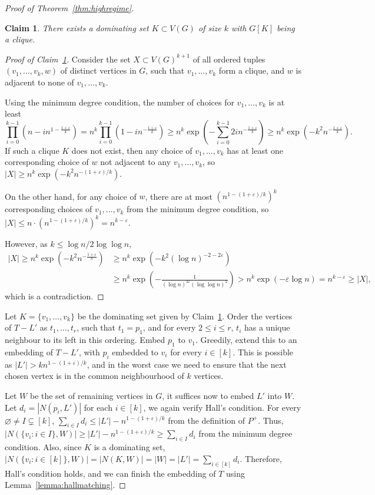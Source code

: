 \documentclass{article}
\theoremstyle{plain}
\newtheorem{claim}[theorem]{Claim}
\theoremstyle{definition}
\numberwithin{equation}{section}
\def\eps{\varepsilon}
\begin{document}
\begin{proof}[Proof of Theorem~\ref{thm:highregime}]
\begin{claim}\label{claim1}
There exists a dominating set $K\subset V(G)$ of size $k$ with $G[K]$ being a clique.
\end{claim}
\begin{proof}[Proof of Claim~\ref{claim1}]
Consider the set $X\subset V(G)^{k+1}$ of all ordered tuples $(v_1,\ldots,v_k,w)$ of distinct vertices in $G$, such that $v_1,\ldots,v_k$ form a clique, and $w$ is adjacent to none of $v_1,\ldots,v_k$. 

Using the minimum degree condition, the number of choices for $v_1,\ldots,v_k$ is at least 
\[\prod_{i=0}^{k-1}\left(n-in^{1-\frac{1+\eps}k}\right)=n^k\prod_{i=0}^{k-1}\left(1-in^{-\frac{1+\eps}k}\right)\geq n^k\exp\left(-\sum_{i=0}^{k-1}2in^{-\frac{1+\eps}k}\right)\geq n^k\exp\left(-k^2n^{-\frac{1+\eps}k}\right).\]
If such a clique $K$ does not exist, then any choice of $v_1,\ldots,v_k$ has at least one corresponding choice of $w$ not adjacent to any $v_1,\ldots,v_k$, so $|X|\geq n^k\exp(-k^2n^{-(1+\eps)/k})$.

On the other hand, for any choice of $w$, there are at most $(n^{1-(1+\eps)/k})^k$ corresponding choices of $v_1,\ldots,v_k$ from the minimum degree condition, so $|X|\leq n\cdot(n^{1-(1+\eps)/k})^k=n^{k-\eps}$. 

However, as $k\leq\log n/2\log\log n$, 
\begin{align*}
|X|\geq n^k\exp\left(-k^2n^{-\frac{1+\eps}k}\right)&\geq n^k\exp\left(-k^2(\log n)^{-2-2\eps}\right)\\
&\geq n^k\exp\left(-\frac1{(\log n)^{2\eps}(\log\log n)^2}\right)>n^k\exp\left(-\eps\log n\right)=n^{k-\eps}\geq|X|,
\end{align*}
which is a contradiction. 
\renewcommand{\qedsymbol}{$\boxdot$}
\end{proof}
\renewcommand{\qedsymbol}{$\square$}
Let $K=\{v_1,\ldots,v_k\}$ be the dominating set given by Claim~\ref{claim1}. Order the vertices of $T-L'$ as $t_1,\ldots,t_r$, such that $t_1=p_1$, and for every $2\leq i\leq r$, $t_i$ has a unique neighbour to its left in this ordering. Embed $p_1$ to $v_1$. Greedily, extend this to an embedding of $T-L'$, with $p_i$ embedded to $v_i$ for every $i\in[k]$. This is possible as $|L'|>kn^{1-(1+\eps)/k}$, and in the worst case we need to ensure that the next chosen vertex is in the common neighbourhood of $k$ vertices. 

Let $W$ be the set of remaining vertices in $G$, it suffices now to embed $L'$ into $W$. Let $d_i=|N(p_i,L')|$ for each $i\in[k]$, we again verify Hall's condition. For every $\varnothing\not=I\subsetneq[k]$, $\sum_{i\in I}d_i\leq |L'|-n^{1-(1+\eps)/k}$ from the definition of $P^+$. Thus, $|N(\{v_i:i\in I\},W)|\geq|L'|-n^{1-(1+\eps)/k}\geq\sum_{i\in I}d_i$ from the minimum degree condition. Also, since $K$ is a dominating set, $|N(\{v_i:i\in[k]\},W)|=|N(K,W)|=|W|=|L'|=\sum_{i\in[k]}d_i$. Therefore, Hall's condition holds, and we can finish the embedding of $T$ using Lemma~\ref{lemma:hallmatching}.
\end{proof}
\end{document}
